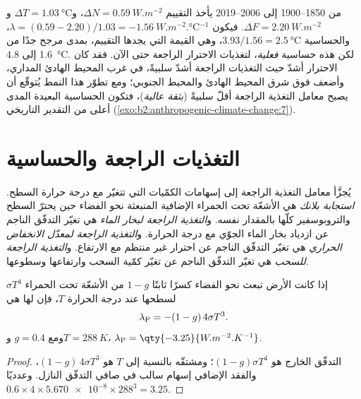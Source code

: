 من 1850--1900 إلى 2006--2019 يأخذ التقييم $\Delta N = \qty{0.59}{W.m^{-2}}$، و$\Delta T =
\qty{1.03}{\celsius}$ و$\Delta F = \qty{2.20}{W.m^{-2}}$. فيكون $\lambda = (0.59 - 2.20)/1.03 =
\qty{-1.56}{W.m^{-2}.\celsius^{-1}}$، والحساسية $3.93/1.56 = \qty{2.5}{\celsius}$،
وهي القيمة التي يجدها التقييم، بمدى مرجح جدًا من 1.6 إلى \qty{4.8}{\celsius}. لكن هذه
حساسية \emph{فعلية}، لتغذيات الاحترار الراجعة حتى الآن. فقد كان الاحترار
أشدّ حيث التغذيات الراجعة أشدّ سلبيةً، في غرب المحيط الهادئ المداري، وأضعف فوق
شرق المحيط الهادئ والمحيط الجنوبي؛ ومع تطوّر هذا النمط يُتوقّع أن يصبح معامل التغذية الراجعة
أقلّ سلبيةً (\emph{بثقة عالية})، فتكون الحساسية البعيدة المدى أعلى من
التقدير التاريخي (\cref{exo:b2:anthropogenic-climate-change:7}).

\section{التغذيات الراجعة والحساسية}\label{sec:b2:anthropogenic-climate-change:feedbacks}

\begin{definition}\label{def:b2:anthropogenic-climate-change:feedbacks}
يُجزَّأ معامل التغذية الراجعة إلى إسهامات الكمّيات التي تتغيّر مع درجة حرارة
السطح. \emph{استجابة بلانك} هي الأشعّة تحت الحمراء الإضافية
المنبعثة نحو الفضاء حين يحترّ السطح والتروبوسفير كلّها بالمقدار نفسه.
و\emph{التغذية الراجعة لبخار الماء} هي تغيّر التدفّق الناجم عن ازدياد
بخار الماء الجوّي مع درجة الحرارة.
و\emph{التغذية الراجعة لمعدّل الانخفاض الحراري} هي تغيّر التدفّق الناجم عن احترار غير منتظم مع الارتفاع. و\emph{التغذية
الراجعة للسحب} هي تغيّر التدفّق الناجم عن تغيّر كمّية السحب وارتفاعها
وسطوعها.
\end{definition}

\begin{proposition}\label{prop:b2:anthropogenic-climate-change:planck}
إذا كانت الأرض تبعث نحو الفضاء كسرًا ثابتًا $1 - g$ من الأشعّة تحت الحمراء $\sigma T^4$ لسطحها عند
درجة الحرارة $T$، فإن  لها هي
\[
  \lambda_{\text P} = -(1 - g)\,4\sigma T^3 .
\]
ومع $g = 0.4$ و$T = \qty{288}{K}$، $\lambda_{\text P} = \qty{-3.25}{W.m^{-2}.K^{-1}}$.
\end{proposition}
\begin{proof}
التدفّق الخارج هو $(1 - g)\sigma T^4$؛ ومشتقّه بالنسبة إلى $T$ هو $(1 - g)\,4\sigma
T^3$، والفقد الإضافي إسهام سالب في صافي التدفّق النازل. وعدديًا $0.6
\times 4 \times \num{5.670e-8} \times 288^3 = 3.25$.
\end{proof}

